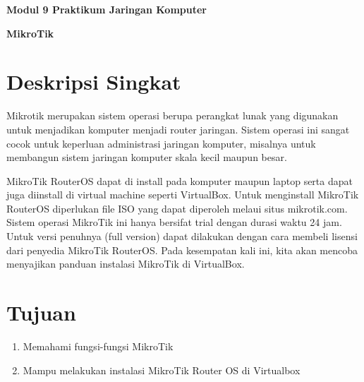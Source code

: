 \documentclass{article}
\begin{document}
    \begin{center}
        \textbf{Modul 9 Praktikum Jaringan Komputer}

        \textbf{MikroTik}
    \end{center}

    \section*{Deskripsi Singkat}
	\begin{flushleft}
		Mikrotik merupakan sistem operasi berupa perangkat lunak yang digunakan untuk menjadikan komputer menjadi router jaringan.
		Sistem operasi ini sangat cocok untuk keperluan administrasi jaringan komputer, misalnya untuk membangun sistem jaringan komputer skala kecil maupun besar.
		\newline

		MikroTik RouterOS dapat di install pada komputer maupun laptop serta dapat juga diinstall di virtual machine seperti VirtualBox.
		Untuk menginstall MikroTik RouterOS diperlukan file ISO yang dapat diperoleh melaui situs mikrotik.com. Sistem operasi MikroTik ini hanya bersifat trial dengan durasi waktu 24 jam.
		Untuk versi penuhnya (full version) dapat dilakukan dengan cara membeli lisensi dari penyedia MikroTik RouterOS.
		Pada kesempatan kali ini, kita akan mencoba menyajikan panduan instalasi MikroTik di VirtualBox.
	\end{flushleft}

    \section*{Tujuan}
    \begin{enumerate}
        \item Memahami fungsi-fungsi MikroTik 
        \item Mampu melakukan instalasi MikroTik Router OS di Virtualbox
    \end{enumerate}
\end{document}
